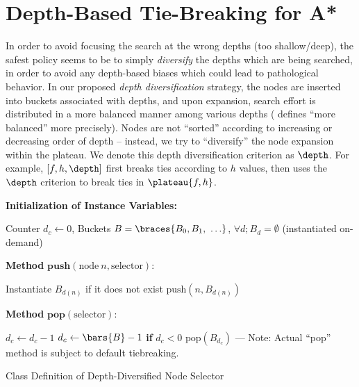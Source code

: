\section{Depth-Based Tie-Breaking for A*}

\label{sec:depth}

In order to avoid focusing the search at the wrong depths (too shallow/deep), 
the safest policy seems to be to simply \emph{diversify} the depths which are being searched,
in order to avoid any depth-based biases which could lead to pathological behavior.
In our proposed \emph{depth diversification} strategy, the nodes are inserted into buckets
associated with depths, and upon expansion, search effort is distributed in a more balanced manner
among various depths ( defines ``more balanced''  more precisely).
Nodes are not  ``sorted''
according to increasing or decreasing order of depth -- instead, we try to 
``diversify'' the node expansion within the plateau.
We denote this depth diversification criterion as $\depth$. 
For example, $[f,h,\depth]$ first breaks ties according to $h$ values,
then uses the $\depth$ criterion to break ties in $\plateau{f,h}$.

\begin{algorithm}
 \textbf{Initialization of Instance Variables:}
\begin{algorithmic}
 \STATE Counter $d_c\leftarrow 0$, Buckets $B=\braces{B_0, B_1,\ \ldots}$, $\forall d; B_d=\emptyset$ (instantiated on-demand)
\end{algorithmic}
 \textbf{Method} $\textbf{push}(\text{node}\ n,\text{selector})$:
\begin{algorithmic}
 \STATE Instantiate $B_{d(n)}$ if it does not exist
 \STATE $\text{push}(n, B_{d(n)})$
\end{algorithmic}
 \textbf{Method} $\textbf{pop}(\text{selector})$:
\begin{algorithmic}[1]
 \LOOP
 \STATE $d_c\leftarrow d_c-1$
 \STATE $d_c\leftarrow \bars{B}-1$ \textbf{if} $d_c<0$
 \RETURN $\text{pop}(B_{d_c})$ --- Note: Actual ``pop'' method is subject to default tiebreaking.
 \ENDIF
 \ENDLOOP
\end{algorithmic}
\caption{Class Definition of Depth-Diversified Node Selector}
\label{alg:depth}
\end{algorithm}


